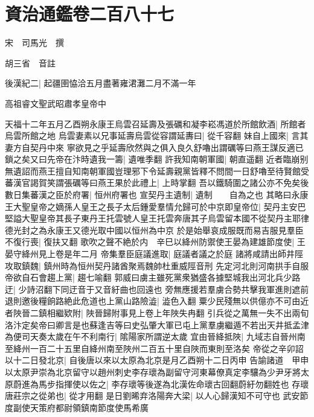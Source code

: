 \section{資治通鑑卷二百八十七}
宋　司馬光　撰

胡三省　音註

後漢紀二|{
	起疆圉恊洽五月盡著雍涒灘二月不滿一年}


高祖睿文聖武昭肅孝皇帝中

天福十二年五月乙酉朔永康王烏雲召延壽及張礪和凝李崧馮道於所館飲酒|{
	所館者烏雲所館之地}
烏雲妻素以兄事延壽烏雲從容謂延夀曰|{
	從千容翻}
妹自上國來|{
	言其妻方自契丹中來}
寧欲見之乎延壽欣然與之俱入良久舒嚕出謂礪等曰燕王謀反適已鎖之矣又曰先帝在汴時遺我一籌|{
	遺唯季翻}
許我知南朝軍國|{
	朝直遥翻}
近者臨崩别無遺詔而燕王擅自知南朝軍國豈理邪下令延壽親黨皆釋不問間一日舒嚕至待賢館受蕃漢官謁賀笑謂張礪等曰燕王果於此禮上|{
	上時掌翻}
吾以鐵騎圍之諸公亦不免矣後數日集蕃漢之臣於府署|{
	恒州府署也}
宣契丹主遺制|{
	遺制　　自為之也}
其略曰永康王大聖皇帝之嫡孫人皇王之長子太后鍾愛羣情允歸可於中京即皇帝位|{
	契丹主安巴堅謚大聖皇帝其長子東丹王托雲號人皇王托雲奔唐其子烏雲留本國不從契丹主耶律德光封之為永康王又德光取中國以恒州為中京}
於是始舉哀成服既而易吉服見羣臣不復行喪|{
	復扶又翻}
歌吹之聲不絶於内　辛巳以絳州防禦使王晏為建雄節度使|{
	王晏守絳州見上卷是年二月}
帝集羣臣庭議進取|{
	庭議者議之於庭}
諸將咸請出師井陘攻取鎮魏|{
	鎮州時為恒州契丹諸酋聚焉魏帥杜重威陘音刑}
先定河北則河南拱手自服帝欲自石會趨上黨|{
	趨七喻翻}
郭威曰虜主雖死黨衆猶盛各據堅城我出河北兵少路迂|{
	少詩沼翻下同迂音于又音紆曲也回遠也}
旁無應援若羣虜合勢共擊我軍進則遮前退則邀後糧餉路絶此危道也上黨山路險澁|{
	澁色入翻}
粟少民殘無以供億亦不可由近者陜晉二鎮相繼欵附|{
	陜晉歸附事見上卷上年陜失冉翻}
引兵從之萬無一失不出兩旬洛汴定矣帝曰卿言是也蘇逢吉等曰史弘肇大軍已屯上黨羣虜繼遁不若出天井抵孟津為便司天奏太歲在午不利南行|{
	隂陽家所謂逆太歲}
宜由晉絳抵陜|{
	九域志自晉州南至絳州一百二十五里自絳州南至陜州二百五十里自陜而東則至洛矣}
帝從之辛卯詔以十二日發北京|{
	自後唐以來以太原為北京是月乙酉朔十二日丙申}
告諭諸道　甲申以太原尹崇為北京留守以趙州刺史李存瓌為副留守河東幕僚真定李驤為少尹牙將太原蔚進為馬步指揮使以佐之|{
	李存瓌等後遂為北漢佐命瓌古回翻蔚紆勿翻姓也}
存瓌唐莊宗之從弟也|{
	從才用翻}
是日劉晞弃洛陽奔大梁|{
	以人心歸漢知不可守也}
武安節度副使天策府都尉領鎮南節度使馬希廣

